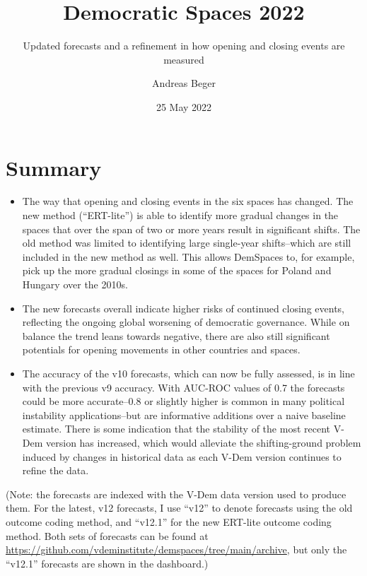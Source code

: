 \documentclass[
  11pt,
]{article}
\title{Democratic Spaces 2022}
\subtitle{Updated forecasts and a refinement in how opening and closing
events are measured}
\author{Andreas Beger}
\date{25 May 2022}
\providecommand{\tightlist}{%
  \setlength{\itemsep}{0pt}\setlength{\parskip}{0pt}}
\begin{document}
\maketitle

{
\setcounter{tocdepth}{2}
\tableofcontents
}
\hypertarget{summary}{%
\section{Summary}\label{summary}}

\begin{itemize}
\tightlist
\item
  The way that opening and closing events in the six spaces has changed.
  The new method (``ERT-lite'') is able to identify more gradual changes
  in the spaces that over the span of two or more years result in
  significant shifts. The old method was limited to identifying large
  single-year shifts--which are still included in the new method as
  well. This allows DemSpaces to, for example, pick up the more gradual
  closings in some of the spaces for Poland and Hungary over the
  2010s.\\
\item
  The new forecasts overall indicate higher risks of continued closing
  events, reflecting the ongoing global worsening of democratic
  governance. While on balance the trend leans towards negative, there
  are also still significant potentials for opening movements in other
  countries and spaces.
\item
  The accuracy of the v10 forecasts, which can now be fully assessed, is
  in line with the previous v9 accuracy. With AUC-ROC values of 0.7 the
  forecasts could be more accurate--0.8 or slightly higher is common in
  many political instability applications--but are informative additions
  over a naive baseline estimate. There is some indication that the
  stability of the most recent V-Dem version has increased, which would
  alleviate the shifting-ground problem induced by changes in historical
  data as each V-Dem version continues to refine the data.
\end{itemize}

(Note: the forecasts are indexed with the V-Dem data version used to
produce them. For the latest, v12 forecasts, I use ``v12'' to denote
forecasts using the old outcome coding method, and ``v12.1'' for the new
ERT-lite outcome coding method. Both sets of forecasts can be found at
\url{https://github.com/vdeminstitute/demspaces/tree/main/archive}, but
only the ``v12.1'' forecasts are shown in the dashboard.)
\end{document}
